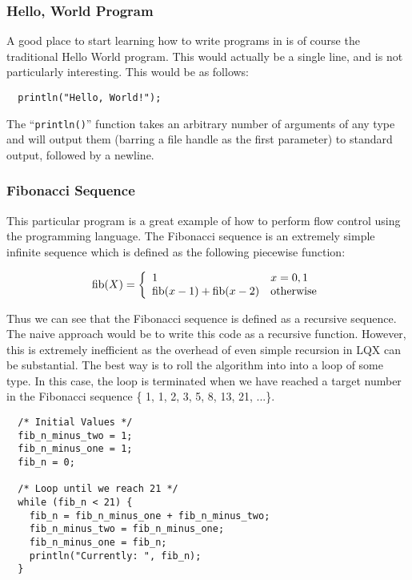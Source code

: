 \subsubsection{Hello, World Program}

A good place to start learning how to write programs in \ModLang is of course
the traditional Hello World program. This would actually be a single line,
and is not particularly interesting. This would be as follows:

\lstset{language=LQX}
\begin{lstlisting}
  println("Hello, World!");
\end{lstlisting}

The ``{\tt println()}'' function takes an arbitrary number of arguments of any
type and will output them (barring a file handle as the first parameter) to
standard output, followed by a newline.

\subsubsection{Fibonacci Sequence}

This particular program is a great example of how to perform flow control
using the \ModLang programming language. The Fibonacci sequence is an extremely
simple infinite sequence which is defined as the following piecewise function:

\begin{equation}
  \mathrm{fib}(X) =  \left\{ \begin{array}{l l} 1 & x = 0, 1 \\ \mathrm{fib}(x-1) +
      \mathrm{fib}(x-2) & \mathrm{otherwise} \end{array} \right.
\end{equation}

Thus we can see that the Fibonacci sequence is defined as a recursive sequence.
The naive approach would be to write this code as a recursive function. However,
this is extremely inefficient as the overhead of even simple recursion in LQX
can be substantial. The best way is to roll the algorithm into into a loop of some
type. In this case, the loop is terminated when we have reached a target
number in the Fibonacci sequence \{ 1, 1, 2, 3, 5, 8, 13, 21, ...\}.

\lstset{language=LQX}
\begin{lstlisting}
  /* Initial Values */
  fib_n_minus_two = 1;
  fib_n_minus_one = 1;
  fib_n = 0;

  /* Loop until we reach 21 */
  while (fib_n < 21) {
    fib_n = fib_n_minus_one + fib_n_minus_two;
    fib_n_minus_two = fib_n_minus_one;
    fib_n_minus_one = fib_n;
    println("Currently: ", fib_n);
  }
\end{lstlisting}

